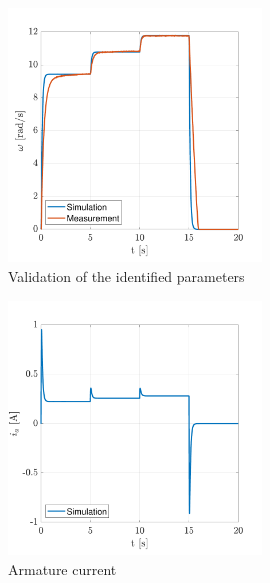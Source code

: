 \documentclass[12pt,english,twoside]{article}
\begin{document}
 \begin{figure}[htb!]
	\centering
	\includegraphics[width=0.6\textwidth]{figures/validation_figure}
	\caption{Validation of the identified parameters}
	\label{validation_figure}
\end{figure}
 \begin{figure}[htb!]
	\centering
	\includegraphics[width=0.6\textwidth]{figures/validation_figure_current}
	\caption{Armature current}
	\label{validation_figure_current}
\end{figure}


\newpage
\end{document}
